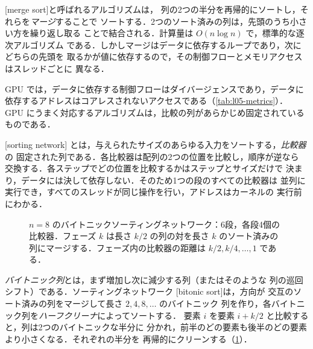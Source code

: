 \documentclass[../main.tex]{subfiles}
\begin{document}
\begin{definition}[マージソート]
  [merge sort]と呼ばれるアルゴリズムは，
  列の2つの半分を再帰的にソートし，それらを\emph{マージ}することで
  ソートする．2つのソート済みの列は，先頭のうち小さい方を繰り返し取る
  ことで結合される．計算量は $O(n \log n)$ で，標準的な逐次アルゴリズム
  である．しかしマージはデータに依存するループであり，次にどちらの先頭を
  取るかが値に依存するので，その制御フローとメモリアクセスはスレッドごとに
  異なる．
\end{definition}

GPU では，データに依存する制御フローはダイバージェンスであり，データに
依存するアドレスはコアレスされないアクセスである（\cref{tab:l05-metrics}）．
GPU にうまく対応するアルゴリズムは，比較の列があらかじめ固定されている
ものである．

\begin{definition}[ソーティングネットワーク]
  [sorting network]
  とは，与えられたサイズのあらゆる入力をソートする，\emph{比較器}の
  固定された列である．各比較器は配列の2つの位置を比較し，順序が逆なら
  交換する．各ステップでどの位置を比較するかはステップとサイズだけで
  決まり，データには決して依存しない．そのため1つの段のすべての比較器は
  並列に実行でき，すべてのスレッドが同じ操作を行い，アドレスはカーネルの
  実行前にわかる．
\end{definition}

\begin{figure}[tb]
  \centering
  
  \caption{$n = 8$ のバイトニックソーティングネットワーク：6段，各段4個の
    比較器．フェーズ $k$ は長さ $k/2$ の列の対を長さ $k$ のソート済みの
    列にマージする．フェーズ内の比較器の距離は $k/2, k/4, \ldots, 1$
    である．}
  \label{fig:l05-bitonic}
\end{figure}

\begin{definition}[バイトニックソート]
  \emph{バイトニック列}とは，まず増加し次に減少する列（またはそのような
  列の巡回シフト）である．ソーティングネットワーク
  [bitonic sort]は，方向が
  交互のソート済みの列をマージして長さ $2, 4, 8, \ldots$ のバイトニック
  列を作り，各バイトニック列を\emph{ハーフクリーナ}によってソートする．
  要素 $i$ を要素 $i + k/2$ と比較すると，列は2つのバイトニックな半分に
  分かれ，前半のどの要素も後半のどの要素より小さくなる．それぞれの半分を
  再帰的にクリーンする（\cref{fig:l05-bitonic}）．
\end{definition}
\end{document}
